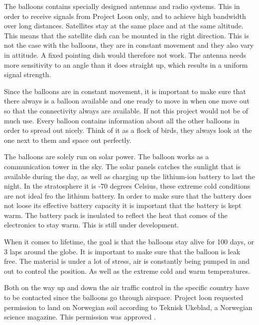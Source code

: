 The balloons contains specially designed antennas and radio systems. This in order to receive signals from Project Loon only, and to achieve high bandwidth over long distances. Satellites stay at the same place and at the same altitude. This means that the satellite dish can be mounted in the right direction. This is not the case with the balloons, they are in constant movement and they also vary in attitude. A fixed pointing dish would therefore not work. The antenna needs more sensitivity to an angle than it does straight up, which results in a uniform signal strength. 

Since the balloons are in constant movement, it is important to make sure that there always is a balloon available and one ready to move in when one move out so that the connectivity always are available. If not this project would not be of much use. Every balloon contains information about all the other balloons in order to spread out nicely. Think of it as a flock of birds, they always look at the one next to them and space out perfectly.

The balloons are solely run on solar power. The balloon works as a communication tower in the sky. The solar panels catches the sunlight that is available during the day, as well as charging up the lithium-ion battery to last the night. In the stratosphere it is -70 degrees Celsius, these extreme cold conditions are not ideal fro the lithium battery. In order to make sure that the battery does not loose its effective battery capacity it is important that the battery is kept warm. The battery pack is insulated to reflect the heat that comes of the electronics to stay warm. This is still under development. 

When it comes to lifetime, the goal is that the balloons stay alive for 100 days, or 3 laps around the globe. It is important to make sure that the balloon is leak free. The material is under a lot of stress, air is constantly being pumped in and out to control the position. As well as the extreme cold and warm temperatures. 

Both on the way up and down the air traffic control in the specific country have to be contacted since the balloons go through airspace. Project loon requested permission to land on Norwegian soil according to Teknisk Ukeblad, a Norwegian science magazine. This permission was approved \cite{loonTU}.


